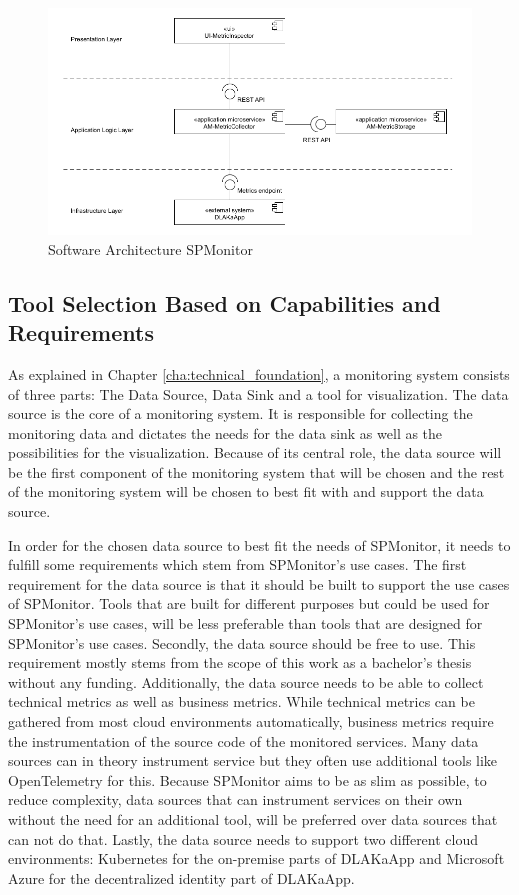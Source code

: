 \begin{figure}[h]
	\centering
	\includegraphics[width=\textwidth]{figures/software_architecture_sps.png}
	\caption{Software Architecture SPMonitor}
	\label{fig:sofware_architecture_spmonitor}
\end{figure}

\subsection{Tool Selection Based on Capabilities and Requirements}

As explained in Chapter \ref{cha:technical_foundation}, a monitoring system consists of three parts:
The Data Source, Data Sink and a tool for visualization.
The data source is the core of a monitoring system. It is responsible for collecting the monitoring data
and dictates the needs for the data sink as well as the possibilities for the visualization.
Because of its central role, the data source will be the first component of the monitoring system that will be chosen
and the rest of the monitoring system will be chosen to best fit with and support the data source.

In order for the chosen data source to best fit the needs of SPMonitor, it needs to fulfill some requirements
which stem from SPMonitor's use cases. The first requirement for the data source is that it should be built
to support the use cases of SPMonitor. Tools that are built for different purposes but could be used for SPMonitor's
use cases, will be less preferable than tools that are designed for SPMonitor's use cases.
Secondly, the data source should be free to use. This requirement mostly stems from the scope of this work
as a bachelor's thesis without any funding.
Additionally, the data source needs to be able to collect technical metrics as well as business metrics.
While technical metrics can be gathered from most cloud environments automatically, business metrics
require the instrumentation of the source code of the monitored services. Many data sources can in theory
instrument service but they often use additional tools like OpenTelemetry for this. Because SPMonitor aims
to be as slim as possible, to reduce complexity, data sources that can instrument services on their own without
the need for an additional tool, will be preferred over data sources that can not do that.
Lastly, the data source needs to support two different cloud environments: Kubernetes for the on-premise parts
of \Gls{DLAKaApp} and Microsoft Azure for the decentralized identity part of DLAKaApp.

